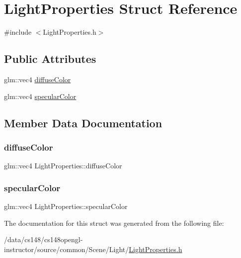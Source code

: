 \hypertarget{struct_light_properties}{}\section{Light\+Properties Struct Reference}
\label{struct_light_properties}


{\ttfamily \#include $<$Light\+Properties.\+h$>$}

\subsection*{Public Attributes}
\begin{DoxyCompactItemize}
\item 
glm\+::vec4 \hyperlink{struct_light_properties_a3af836c1b945d14e8e11baccae2c8c9e}{diffuse\+Color}
\item 
glm\+::vec4 \hyperlink{struct_light_properties_a802ad3c68cfec9c97b0de463ff6e74ac}{specular\+Color}
\end{DoxyCompactItemize}


\subsection{Member Data Documentation}
\hypertarget{struct_light_properties_a3af836c1b945d14e8e11baccae2c8c9e}{}\label{struct_light_properties_a3af836c1b945d14e8e11baccae2c8c9e} 
\subsubsection{\texorpdfstring{diffuse\+Color}{diffuseColor}}
{\footnotesize\ttfamily glm\+::vec4 Light\+Properties\+::diffuse\+Color}

\hypertarget{struct_light_properties_a802ad3c68cfec9c97b0de463ff6e74ac}{}\label{struct_light_properties_a802ad3c68cfec9c97b0de463ff6e74ac} 
\subsubsection{\texorpdfstring{specular\+Color}{specularColor}}
{\footnotesize\ttfamily glm\+::vec4 Light\+Properties\+::specular\+Color}



The documentation for this struct was generated from the following file\+:\begin{DoxyCompactItemize}
\item 
/data/cs148/cs148opengl-\/instructor/source/common/\+Scene/\+Light/\hyperlink{_light_properties_8h}{Light\+Properties.\+h}\end{DoxyCompactItemize}
